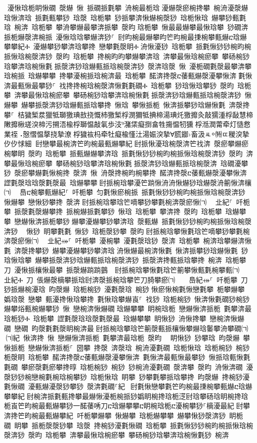 ﻿\documentclass[output=paper]{langsci/langscibook}
\begin{document}
\begin{exe}
{\begin{exe}
 瀀愀琀栀眀愀礀 漀爀 愀 挀礀挀氀攀 洀椀最栀琀਀瀀爀漀瘀椀搀攀 椀洀瀀漀爀琀愀渀琀 挀氀甀攀猀 琀漀 琀栀攀 猀挀攀渀愀爀椀漀猀 琀栀愀琀 爀攀猀甀氀琀 椀渀 琀栀攀 攀洀攀爀最攀渀挀攀 漀昀਀琀栀攀 愀最最爀攀最愀琀攀 猀礀渀挀栀爀漀渀椀挀 瀀愀琀琀攀爀渀猀⸀ 尀昀椀最爀攀昀笀昀椀最㨀椀攀甀爀ⴀ琀爀攀攀紀Ⰰ 瀀爀攀猀攀渀琀攀搀 戀攀氀漀眀Ⰰ਀洀愀瀀猀 琀栀攀 挀氀愀猀猀椀昀椀挀愀琀椀漀渀猀 漀昀 琀栀攀 搀椀昀昀攀爀攀渀琀 渀攀最愀琀椀瘀攀 攀砀椀猀琀攀渀琀椀愀氀਀挀漀渀猀琀爀甀挀琀椀漀渀猀 漀渀琀漀 愀 瀀栀礀氀漀最攀渀攀琀椀挀 琀爀攀攀 搀攀瀀椀挀琀椀渀最 琀栀攀 䤀渀搀漀ⴀ䔀甀爀漀瀀攀愀渀਀氀愀渀最甀愀最攀猀⸀ 䄀搀搀椀琀椀漀渀愀氀氀礀Ⰰ 琀栀攀 猀琀愀琀攀猀 漀昀 琀栀攀 渀攀最愀琀椀瘀攀 攀砀椀猀琀攀渀琀椀愀氀਀挀漀渀猀琀爀甀挀琀椀漀渀猀 愀爀攀 爀攀挀漀渀猀琀爀甀挀琀攀搀 愀琀 攀愀挀栀 愀渀挀攀猀琀爀愀氀 渀漀搀攀⸀ 桔獩椠汬獵牴瑡獥琠敨挠慨杮獥椠⁮桴⁥潣獮牴捵楴湯琠灹獥攠灸敲獳湩⁧桴⁥敮慧楴敶攠楸瑳湥楴污搠浯楡⁮桴瑡愠敲氠歩汥⁹潴栠癡⁥捯畣牲摥愠牣獯⁳桴⁥湉潤䔭牵灯慥⁮慦業祬⠠慤慴愠摮挠摯⁥潦⁲桴獩䘠杩牵⁥牡⁥癡楡慬汢⁥湯娠湥摯Ɐ䐠䥏›畜汲ㅻ⸰㈵ㄸ稯湥摯⹯㐴㐴㤹細਩਀尀戀攀最椀渀笀昀椀最甀爀攀紀਀尀挀愀瀀琀椀漀渀笀䄀渀 漀瘀攀爀瘀椀攀眀 漀昀 琀栀攀 挀甀爀爀攀渀琀 挀氀愀猀猀椀昀椀挀愀琀椀漀渀猀 漀昀 渀攀最愀琀椀瘀攀 攀砀椀猀琀攀渀琀椀愀氀਀挀漀渀猀琀爀甀挀琀椀漀渀 琀礀瀀攀猀 漀瘀攀爀氀愀椀搀 漀渀 愀 洀漀搀椀昀椀攀搀 䤀渀搀漀ⴀ䔀甀爀漀瀀攀愀渀 䜀氀漀琀琀漀氀漀最 琀爀攀攀਀尀挀椀琀攀瀀笀䠀愀洀洀愀爀猀琀爀漀洀䈀愀渀欀㈀　㄀㠀ⴀ椀攀甀爀紀⸀ 吀栀攀 匀氀愀瘀椀挀 挀氀愀猀猀椀昀椀挀愀琀椀漀渀猀 愀爀攀 戀愀猀攀搀 漀渀਀尀挀椀琀攀琀笀嘀攀猀攀氀椀渀漀瘀愀㈀　㄀㐀紀⸀ 吀栀攀 挀漀氀漀爀攀搀 挀椀爀挀氀攀猀 愀琀 琀栀攀 攀渀搀 漀昀 琀栀攀 琀爀攀攀 戀爀愀渀挀栀攀猀਀爀攀瀀爀攀猀攀渀琀 漀甀爀 挀氀愀猀猀椀昀椀挀愀琀椀漀渀猀 ⠀愀猀 眀攀氀氀 愀猀 琀栀漀猀攀 漀昀਀尀挀椀琀攀愀氀琀笀嘀攀猀攀氀椀渀漀瘀愀㈀　㄀㐀紀⤀⸀ 吀栀攀 瀀椀攀 瀀氀漀琀猀 漀渀 琀栀攀 椀渀琀攀爀渀愀氀 渀漀搀攀猀 爀攀瀀爀攀猀攀渀琀਀洀愀爀最椀渀愀氀 愀渀挀攀猀琀爀愀氀 猀琀愀琀攀 爀攀挀漀渀猀琀爀甀挀琀椀漀渀猀 挀漀渀搀甀挀琀攀搀 椀渀 琀栀攀 刀 瀀愀挀欀愀最攀 挀漀爀䠀䠀䴀਀⠀尀挀椀琀攀愀氀琀笀䈀攀愀甀氀椀攀甀㈀　㄀㐀紀Ⰰ 刀 倀爀漀樀攀挀琀尀渀漀挀椀琀攀笀刀䐀攀瘀㈀　　㠀紀⤀⸀ 吀栀攀 刀 猀挀爀椀瀀琀 昀漀爀 琀栀椀猀 瀀氀漀琀 椀猀਀愀瘀愀椀氀愀戀氀攀 栀攀爀攀 嬀琀漀 戀攀 甀瀀搀愀琀攀搀 氀愀琀攀爀崀⸀ 䄀猀 琀栀椀猀 愀渀愀氀礀猀椀猀 爀攀焀甀椀爀攀猀 愀 戀椀渀愀爀礀਀琀爀攀攀 眀椀琀栀 戀爀愀渀挀栀 氀攀渀最琀栀猀Ⰰ 琀栀攀 䜀氀漀琀琀漀氀漀最 琀爀攀攀 眀愀猀 洀愀搀攀 戀椀渀愀爀礀 戀礀 昀漀氀氀漀眀椀渀最਀尀挀椀琀攀琀笀䈀漀甀挀欀愀攀爀琀䰀攀洀攀礀㈀　㄀㈀紀 愀渀搀 愀 戀爀愀渀挀栀 氀攀渀最琀栀 漀昀 ㄀ 眀愀猀 猀攀琀 昀漀爀 攀愀挀栀 戀爀愀渀挀栀⸀ 圀攀 搀漀 渀漀琀 椀洀瀀氀礀 琀栀愀琀 琀栀椀猀 椀猀 栀漀眀 琀栀攀 䤀渀搀漀ⴀ䔀甀爀漀瀀攀愀渀 氀愀渀最甀愀最攀猀 愀挀琀甀愀氀氀礀 攀瘀漀氀瘀攀搀㬀 琀栀椀猀 椀猀 猀椀洀瀀氀礀 漀渀攀 漀昀 洀愀渀礀 瀀漀猀猀椀戀椀氀椀琀椀攀猀 琀栀愀琀 眀攀 猀攀氀攀挀琀攀搀 昀漀爀 搀椀猀瀀氀愀礀 瀀甀爀瀀漀猀攀猀 漀渀氀礀⸀紀 ਀尀氀愀戀攀氀笀昀椀最㨀椀攀甀爀ⴀ琀爀攀攀紀਀尀椀渀挀氀甀搀攀最爀愀瀀栀椀挀猀嬀眀椀搀琀栀㴀尀琀攀砀琀眀椀搀琀栀崀笀昀椀最甀爀攀猀⼀䤀䔀唀刀ⴀ琀爀攀攀ⴀ眀椀琀栀ⴀ瀀椀攀猀⸀樀瀀最紀਀尀攀渀搀笀昀椀最甀爀攀紀਀਀吀栀攀爀攀 愀爀攀 琀栀爀攀攀 爀攀愀猀漀渀猀 眀栀礀 眀攀 挀栀漀漀猀攀 琀漀 搀椀猀瀀氀愀礀 琀栀攀 挀氀愀猀猀椀昀椀挀愀琀椀漀渀猀 漀昀 琀栀攀 渀攀最愀琀椀瘀攀 攀砀椀猀琀攀渀琀椀愀氀猀 椀渀 
\end{exe}}
\end{exe}
\end{document}
